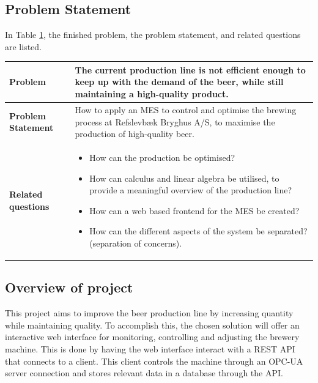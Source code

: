 \subsection{Problem Statement}
In Table \ref{table:problem-statement-report}, the finished problem, the problem
statement, and related questions are listed.
\begin{table}[ht]
    \begin{tabularx}{\textwidth}{|>{\RaggedRight}p{4cm}|>{\RaggedRight}X|}
        \hline
        \textbf{Problem} & The current production line is not efficient enough to keep up with the demand of the beer, while still maintaining a high-quality product. \\
        \hline
        \textbf{Problem Statement} & How to apply an MES to control and optimise the brewing process at Refslevbæk Bryghus A/S, to maximise the production of high-quality beer. \\
        \hline
        \textbf{Related questions} & 
            \begin{itemize}
                \item How can the production be optimised?
                \item How can calculus and linear algebra be utilised, to provide a meaningful overview of the production line?
                \item How can a web based frontend for the MES be created?
                \item How can the different aspects of the system be separated? (separation of concerns).
            \end{itemize} \\
            \hline
    \end{tabularx}
    \label{table:problem-statement-report}
\end{table} 

\subsection{Overview of project}
This project aims to improve the beer production line by increasing quantity
while maintaining quality. To accomplish this, the chosen solution will offer
an interactive web interface for monitoring, controlling and adjusting the
brewery machine. This is done by having the web interface interact with a REST
API that connects to a client. This client controls the machine through an
OPC-UA server connection and stores relevant data in a database through the API.

